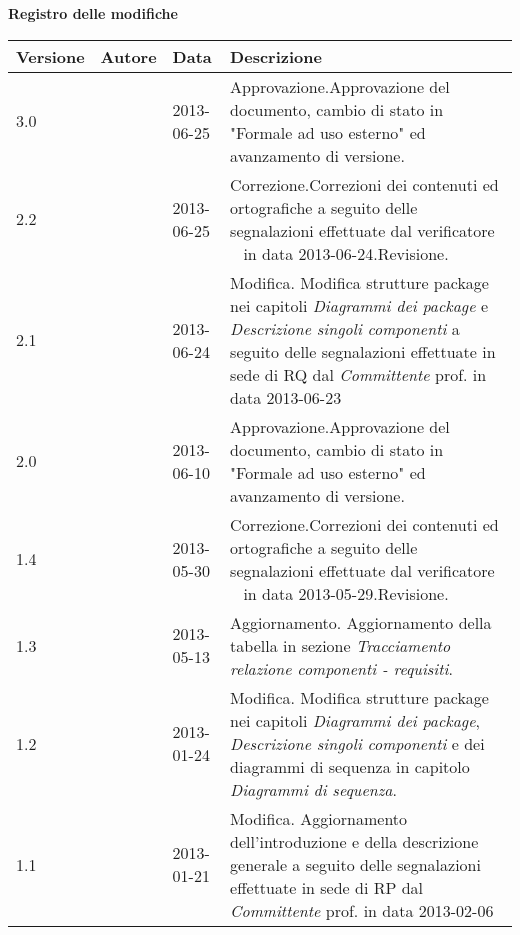 \Large{\textbf{Registro delle modifiche}}\\
\normalsize

\label{tabVers}
	\begin{longtable}{p{} p{} p{} p{}} 
\toprule
\textbf{Versione}	&	\textbf{Autore}	&	\textbf{Data}	&	\textbf{Descrizione}\\
\midrule
\midrule
3.0	&	\VP &	2013-06-25	&	Approvazione.\newline Approvazione del documento, cambio di stato in "Formale ad uso esterno" ed avanzamento di versione.\\
\midrule
2.2	&	\VP &	2013-06-25	&	Correzione.\newline Correzioni dei contenuti ed ortografiche a seguito delle segnalazioni effettuate dal verificatore \SL~ in data 2013-06-24.\newline Revisione.\\
\midrule
2.1	&	\VP &	2013-06-24	&	Modifica. \newline Modifica strutture package nei capitoli \textit{Diagrammi dei package} e \textit{Descrizione singoli componenti} a seguito delle segnalazioni effettuate in sede di RQ dal \emph{Committente} prof. \Vardanega in data 2013-06-23\\
\midrule
2.0	&	\VP &	2013-06-10	&	Approvazione.\newline Approvazione del documento, cambio di stato in "Formale ad uso esterno" ed avanzamento di versione.\\
\midrule
1.4	&	\FZ &	2013-05-30	&	Correzione.\newline Correzioni dei contenuti ed ortografiche a seguito delle segnalazioni effettuate dal verificatore \DC~ in data 2013-05-29.\newline Revisione.\\
\midrule
1.3	&	\EZ &	2013-05-13 	&	Aggiornamento. \newline Aggiornamento della tabella in sezione \textit{Tracciamento relazione componenti - requisiti}.\\
\midrule
1.2	&	\EZ &	2013-01-24	&	Modifica. \newline Modifica strutture package nei capitoli \textit{Diagrammi dei package}, \textit{Descrizione singoli componenti} e dei diagrammi di sequenza in capitolo \textit{Diagrammi di sequenza}.\\
\midrule
1.1	&	\FZ &	2013-01-21	&	Modifica. \newline Aggiornamento dell'introduzione e della descrizione generale a seguito delle segnalazioni effettuate in sede di RP dal \emph{Committente} prof. \Vardanega in data 2013-02-06\\

\end{longtable}
